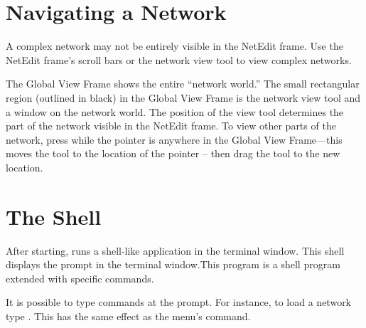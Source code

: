 \section{Navigating a Network}
\label{sec:navnetwork}

A complex network may not be entirely visible in the NetEdit frame.
Use the NetEdit frame's scroll bars or the network view tool to view
complex networks.

The Global View Frame shows the entire ``network world.''  The small
rectangular region (outlined in black) in the Global View Frame is the
network view tool and a window on the network world. The position of
the view tool determines the part of the network visible in the
NetEdit frame.  To view other parts of the network, press
 while the pointer is anywhere in the Global View
Frame---this moves the tool to the location of the pointer -- then
drag the tool to the new location.


\section{The \sr{} Shell}
\label{sec:termapp}

After starting, \sr{} runs a shell-like application in the terminal
window. This shell displays the prompt
 in the terminal window.This program is a
 shell program extended with
\sr{} specific commands.

It is possible to type \tcl{} \sr{} commands at the prompt.  For
instance, to load a network type .  This has the same effect as the 
menu's  command.
